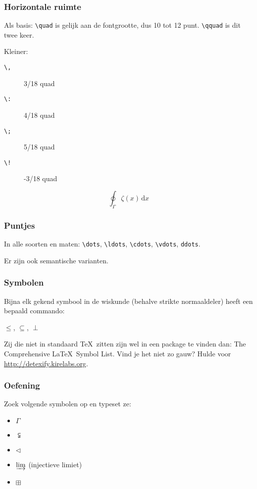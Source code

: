 \begin{frame}[fragile]
  \frametitle{Horizontale ruimte}

  Als basis: \verb|\quad| is gelijk aan de fontgrootte, dus 10 tot 12 punt. \verb|\qquad| is dit twee keer.

  Kleiner:
  \begin{description}
    \item[\texttt{\textbackslash,}] 3/18 quad
    \item[\texttt{\textbackslash:}] 4/18 quad
    \item[\texttt{\textbackslash;}] 5/18 quad
    \item[\texttt{\textbackslash!}] -3/18 quad
  \end{description}

  \begin{equation}
    \oint_\Gamma \zeta(x)\,\mathrm{d}x
  \end{equation}
\end{frame}

\begin{frame}[fragile]
  \frametitle{Puntjes}

  In alle soorten en maten: \verb|\dots|, \verb|\ldots|, \verb|\cdots|, \verb|\vdots|, \verb|ddots|.

  Er zijn ook semantische varianten.
\end{frame}

\begin{frame}[fragile]
  \frametitle{Symbolen}

  Bijna elk gekend symbool in de wiskunde (behalve strikte normaaldeler) heeft een bepaald commando:
  \begin{LTXexample}
$\leq$, $\subseteq$, $\perp$
  \end{LTXexample}

  Zij die niet in standaard \TeX\ zitten zijn wel in een package te vinden dan: The Comprehensive \LaTeX\ Symbol List. Vind je het niet zo gauw? Hulde voor \url{http://detexify.kirelabs.org}.
\end{frame}

\begin{frame}
  \frametitle{Oefening}

  Zoek volgende symbolen op en typeset ze:
  \begin{itemize}
	\item $\Gamma$
	\item $\subsetneqq$
	\item $\triangleleft$
	\item $\varinjlim$ (injectieve limiet)
	\item $\boxplus$
  \end{itemize}
\end{frame}

